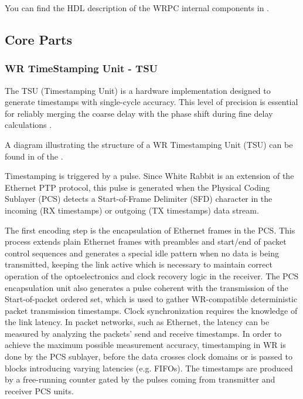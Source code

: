 \noindent You can find the HDL description of the WRPC internal components in \cite{WRPC:ohwr}.

\newpage

\subsection{Core Parts}

\subsubsection{WR TimeStamping Unit - TSU}

\noindent The TSU (Timestamping Unit) is a hardware implementation designed to generate timestamps with single-cycle accuracy. This level of precision is essential for reliably merging the coarse delay with the  phase shift during fine delay calculations \cite{wr-draft}.

\vspace{5mm}

\noindent A diagram illustrating the structure of a WR Timestamping Unit (TSU) can be found in  of the  \cite{wr-draft}.

\vspace{5mm}

\noindent Timestamping is triggered by a pulse.
Since White Rabbit is an extension of the Ethernet PTP protocol, this pulse is generated when the Physical Coding Sublayer (PCS) detects a Start-of-Frame Delimiter (SFD) character in the incoming (RX timestamps) or outgoing (TX timestamps) data stream.

\vspace{5mm} 

\noindent The first encoding step is the encapsulation of Ethernet frames in the PCS.
This process extends plain Ethernet frames with preambles and start/end of packet control sequences and generates a special idle pattern when no data is being transmitted, keeping the link active  which is necessary to maintain correct operation of the optoelectronics and clock recovery logic in the receiver.
The PCS encapsulation unit also generates a pulse coherent with the transmission of the Start-of-packet ordered set, which is used to gather WR-compatible deterministic packet transmission timestamps. Clock synchronization requires the knowledge of the link latency. 
In packet networks, such as Ethernet, the latency can be measured by analyzing the packets’ send and receive timestamps.
In order to achieve the maximum possible measurement accuracy, timestamping in WR is done by the PCS sublayer, before the data crosses clock domains or is passed to blocks introducing varying latencies (e.g. FIFOs). The timestamps are produced by a free-running counter gated by the pulses coming from transmitter and receiver PCS units. \cite{Tomasz-MSc}

